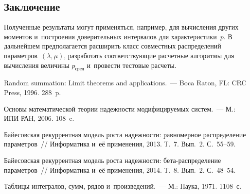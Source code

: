 \begin{multicols}{2}


\section{Заключение}

Полученные результаты могут применяться, например, для
вычисления других моментов и~построения доверительных интервалов
для характеристики~$p$.
%
В дальнейшем предполагается расширить класс совместных распределений
параметров~$(\lambda, \mu)$, разработать соответствующие расчетные алгоритмы
для вычисления величины $p_{\mathrm{сред}}$ и~провести тестовые расчеты.

\vspace*{-9pt}

{\small\frenchspacing
 {%
 \begin{thebibliography}{9}
Random summation: Limit theorems and applications.~--- Boca Raton, FL:
CRC Press, 1996. 288~p.

\columnbreak

Основы математической теории надежности модифицируемых систем.~---
М.: ИПИ РАН, 2006. 108~c.

\vspace*{4pt}

Байесовская рекуррентная модель роста надежности:
равномерное распределение параметров~//
Информатика и~её применения, 2013. Т.~7. Вып.~2. С.~55--59.

\vspace*{4pt}

Байесовская рекуррентная модель роста надежности:
бе\-та-рас\-пре\-де\-ле\-ние параметров~//
Информатика и~её применения, 2014. Т.~8. Вып.~2. С.~48--54.

\vspace*{4pt}

Таблицы интегралов, сумм, рядов и~произведений.~--- М.: Наука, 1971. 1108~с.
 \end{thebibliography}

 }
 }

\end{multicols}

